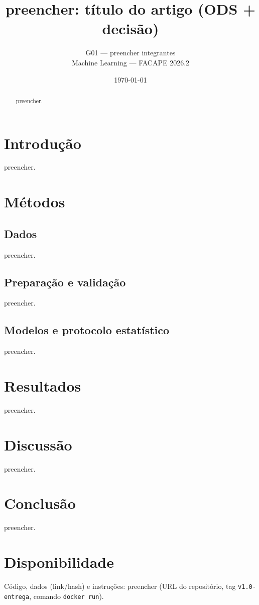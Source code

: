 \documentclass[11pt,a4paper]{article}
\title{preencher: título do artigo (ODS + decisão)}
\author{G01 --- preencher integrantes \\ Machine Learning --- FACAPE 2026.2}
\date{\today}
\begin{document}
\maketitle

\begin{abstract}
preencher.
\end{abstract}

\section{Introdução}
preencher.

\section{Métodos}
\subsection{Dados}
preencher.

\subsection{Preparação e validação}
preencher.

\subsection{Modelos e protocolo estatístico}
preencher.

\section{Resultados}
% 
preencher.

\section{Discussão}
preencher.

\section{Conclusão}
preencher.

\section*{Disponibilidade}
Código, dados (link/hash) e instruções: preencher (URL do repositório, tag
\texttt{v1.0-entrega}, comando \texttt{docker run}).



\end{document}
